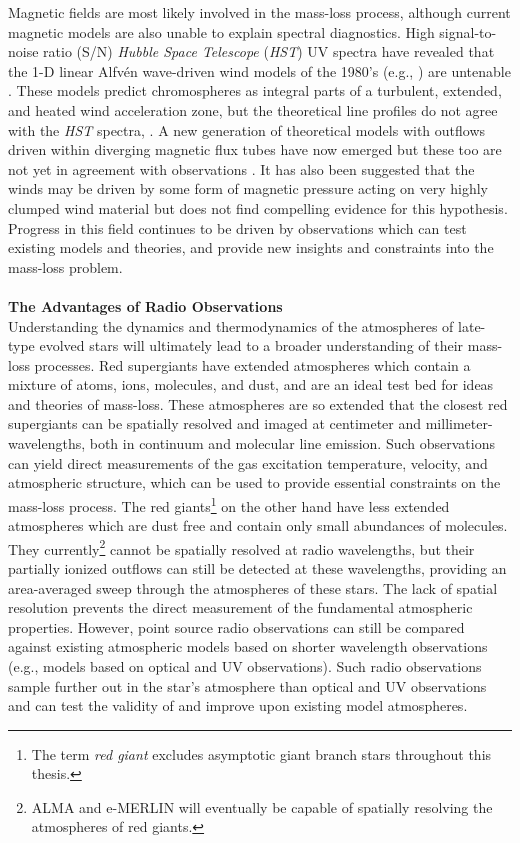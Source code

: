 Magnetic fields are most likely involved in the mass-loss process, although current magnetic models are also unable to explain spectral diagnostics. High signal-to-noise ratio (S/N) \textit{Hubble Space Telescope} (\textit{HST}) UV spectra have revealed that the 1-D linear Alfv\'en wave-driven wind models of the 1980’s (e.g., \citealt{hartmann_1980,harper_1988}) are untenable \citep{harper_2001}. These models predict chromospheres as integral parts of a turbulent, extended, and heated wind acceleration zone, but the theoretical line profiles do not agree with the \textit{HST} spectra, \cite[e.g.,][]{judge_1998}. A new generation of theoretical models with outflows driven within diverging magnetic flux tubes have now emerged \citep{falceta_2006, suzuki_2007} but these too are not yet in agreement with observations \citep{crowley_2009}. It has also been suggested that the winds may be driven by some form of magnetic pressure acting on very highly clumped wind material \citep{eaton_2008} but \cite{harper_2010} does not find compelling evidence for this hypothesis. Progress in this field continues to be driven by observations which can test existing models and theories, and provide new insights and constraints into the mass-loss problem.\\
\\
\textbf{The Advantages of Radio Observations}\\
Understanding the dynamics and thermodynamics of the atmospheres of late-type evolved stars will ultimately lead to a broader understanding of their mass-loss processes. Red supergiants have extended atmospheres which contain a mixture of atoms, ions, molecules, and dust, and are an ideal test bed for ideas and theories of mass-loss. These atmospheres are so extended that the closest red supergiants can be spatially resolved and imaged at centimeter and millimeter-wavelengths, both in continuum and molecular line emission. Such observations can yield direct measurements of the gas excitation temperature, velocity, and atmospheric structure, which can be used to provide essential constraints on the mass-loss process. The red giants\footnote{The term \textit{red giant} excludes asymptotic giant branch stars throughout this thesis.} on the other hand have less extended atmospheres which are dust free and contain only small abundances of molecules. They currently\footnote{ALMA and e-MERLIN will eventually be capable of spatially resolving the atmospheres of red giants.} cannot be spatially resolved at radio wavelengths, but their partially ionized outflows can still be detected at these wavelengths, providing an area-averaged sweep through the atmospheres of these stars. The lack of spatial resolution prevents the direct measurement of the fundamental atmospheric properties. However, point source radio observations can still be compared against existing atmospheric models based on shorter wavelength observations (e.g., models based on optical and UV observations). Such radio observations sample further out in the star's atmosphere than optical and UV observations and can test the validity of and improve upon existing model atmospheres. 

